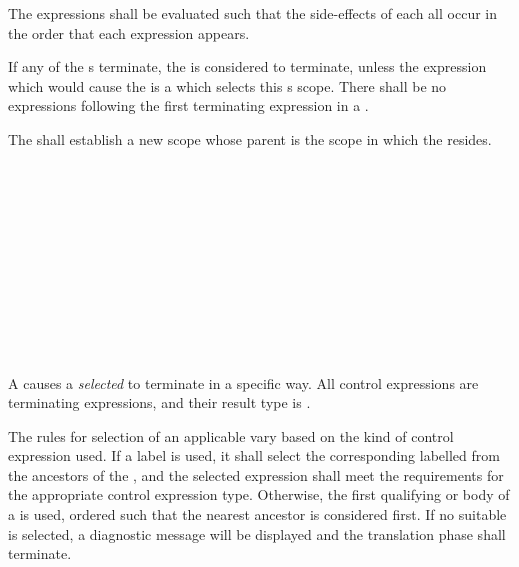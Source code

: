 \specsubsubitem
The expressions shall be evaluated such that the side-effects of each all occur
in the order that each expression appears.

\specsubsubitem
If any of the s terminate, the
 is considered to terminate, unless the
expression which would cause the  is a
 which selects this
s scope. There shall be no expressions
following the first terminating expression in a .

\specsubsubitem
The  shall establish a new scope whose parent is
the scope in which the  resides.


\begin{grammar}
 \\
	  \\
	  \\
	  \\
	 \\

 \\
	 \\
	  \\
	  \\
	  \terminal{,}  \\
\end{grammar}

\specsubsubitem
A  causes a \textit{selected}
 to terminate in a specific way. All control expressions
are terminating expressions, and their result type is .

\specsubsubitem
The rules for selection of an applicable  vary based on
the kind of control expression used. If a label is used, it shall select the
corresponding labelled  from the ancestors of
the , and the selected expression shall meet the
requirements for the appropriate control expression type. Otherwise, the first
qualifying  or body of a 
is used, ordered such that the nearest ancestor is considered first. If no
suitable  is selected, a diagnostic message will be
displayed and the translation phase shall terminate.

